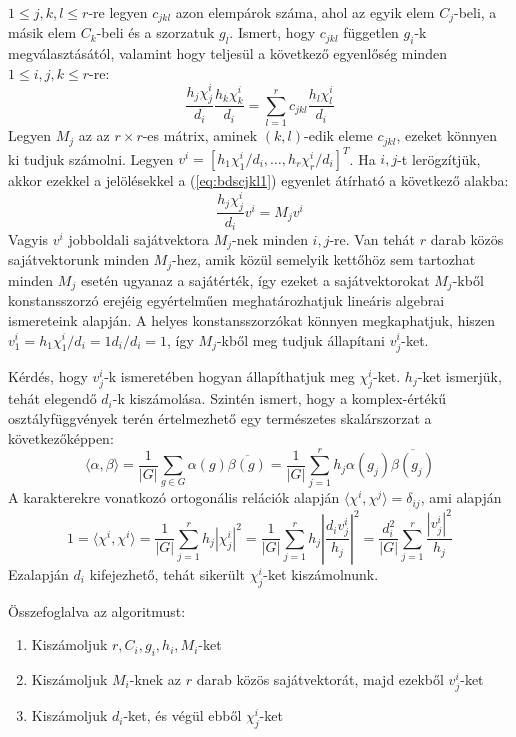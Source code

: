 $1 \le j, k, l \le r$-re legyen $c_{jkl}$ azon elempárok száma, ahol az egyik elem $C_j$-beli, a másik elem $C_k$-beli és a szorzatuk $g_l$.
Ismert, hogy $c_{jkl}$ független $g_i$-k megválasztásától, valamint hogy teljesül a következő egyenlőség minden $1 \le i, j, k \le r$-re:
\begin{equation}
\label{eq:bdscjkl1}
\frac{h_j\chi^i_j}{d_i}\frac{h_k\chi^i_k}{d_i}=\sum_{l=1}^r c_{jkl}\frac{h_l\chi^i_l}{d_i}
\end{equation}
Legyen $M_j$ az az $r\times r$-es mátrix, aminek $(k,l)$-edik eleme $c_{jkl}$, ezeket könnyen ki tudjuk számolni.
Legyen $v^i=[h_1\chi^i_1/d_i, \dots, h_r\chi^i_r/d_i]^T$.
Ha $i, j$-t lerögzítjük, akkor ezekkel a jelölésekkel a (\ref{eq:bdscjkl1}) egyenlet átírható a következő alakba:
\begin{equation}
\label{eq:bdscjkl2}
\frac{h_j\chi^i_j}{d_i}v^i=M_j v^i
\end{equation}
Vagyis $v^i$ jobboldali sajátvektora $M_j$-nek minden $i, j$-re.
Van tehát $r$ darab közös sajátvektorunk minden $M_j$-hez, amik közül semelyik kettőhöz sem tartozhat minden $M_j$ esetén ugyanaz a sajátérték,
így ezeket a sajátvektorokat $M_j$-kből konstansszorzó erejéig egyértelműen meghatározhatjuk lineáris algebrai ismereteink alapján.
A helyes konstansszorzókat könnyen megkaphatjuk, hiszen $v^i_1=h_1\chi^i_1/d_i=1 d_i/d_i=1$, így $M_j$-kből meg tudjuk állapítani $v^i_j$-ket.

Kérdés, hogy $v^i_j$-k ismeretében hogyan állapíthatjuk meg $\chi^i_j$-ket.
$h_j$-ket ismerjük, tehát elegendő $d_i$-k kiszámolása.
Szintén ismert, hogy a komplex-értékű osztályfüggvények terén értelmezhető egy természetes skalárszorzat a következőképpen:
\begin{equation}
\label{eq:bdsscalar}
\langle \alpha, \beta \rangle = \frac{1}{|G|}\sum_{g\in G}\alpha(g)\overline{\beta(g)} = \frac{1}{|G|}\sum_{j=1}^r h_j \alpha(g_j) \overline{\beta(g_j)}
\end{equation}
A karakterekre vonatkozó ortogonális relációk alapján $\langle \chi^i, \chi^j \rangle = \delta_{ij}$, ami alapján
\begin{equation}
\label{eq:bdsdi1}
1 = \langle \chi^i, \chi^i \rangle = \frac{1}{|G|}\sum_{j=1}^r h_j |\chi^i_j|^2 = \frac{1}{|G|}\sum_{j=1}^r h_j \left|\frac{d_i v^i_j}{h_j}\right|^2 = 
\frac{d_i^2}{|G|}\sum_{j=1}^r \frac{|v^i_j|^2}{h_j}
\end{equation}
Ezalapján $d_i$ kifejezhető, tehát sikerült $\chi^i_j$-ket kiszámolnunk.

\noindent
Összefoglalva az algoritmust:
\begin{enumerate}
\item Kiszámoljuk $r, C_i, g_i, h_i, M_i$-ket
\item Kiszámoljuk $M_i$-knek az $r$ darab közös sajátvektorát, majd ezekből $v^i_j$-ket
\item Kiszámoljuk $d_i$-ket, és végül ebből $\chi^i_j$-ket
\end{enumerate}

